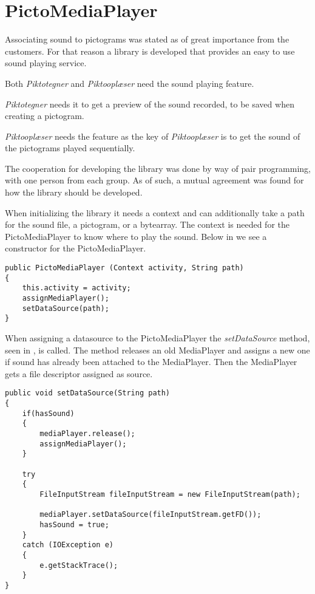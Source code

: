 \section{PictoMediaPlayer}
\label{sec:pictomediaplayer}
Associating sound to pictograms was stated as of great importance from the customers.
For that reason a library is developed that provides an easy to use sound playing service.

Both \textit{Piktotegner} and \textit{Piktooplæser} need the sound playing feature. 

\textit{Piktotegner} needs it to get a preview of the sound recorded, to be saved when creating a pictogram.

\textit{Piktooplæser} needs the feature as the key of \textit{Piktooplæser} is to get the sound of the pictograms played sequentially. 

The cooperation for developing the library was done by way of pair programming, with one person from each group.
As of such, a mutual agreement was found for how the library should be developed.

When initializing the library it needs a context and can additionally take a path for the sound file, a pictogram, or a bytearray. The context is needed for the PictoMediaPlayer to know where to play the sound. Below in  we see a constructor for the PictoMediaPlayer.

\begin{lstlisting}[caption={Constructor for PictoMediaPlayer.},label={lst:constructor}]
public PictoMediaPlayer (Context activity, String path)
{
    this.activity = activity;
    assignMediaPlayer();
    setDataSource(path);
}
\end{lstlisting}

When assigning a datasource to the PictoMediaPlayer the \textit{setDataSource} method, seen in , is called. The method releases an old MediaPlayer and assigns a new one if sound has already been attached to the MediaPlayer.
Then the MediaPlayer gets a file descriptor assigned as source.

\begin{lstlisting}[caption={SetDataSource method of PictoMediaPlayer.},label={lst:setdatasource}]
public void setDataSource(String path)
{
    if(hasSound)
    {
        mediaPlayer.release();
        assignMediaPlayer();
    }

    try
    {
        FileInputStream fileInputStream = new FileInputStream(path);

        mediaPlayer.setDataSource(fileInputStream.getFD());
        hasSound = true;
    }
    catch (IOException e)
    {
        e.getStackTrace();
    }
}
\end{lstlisting}

